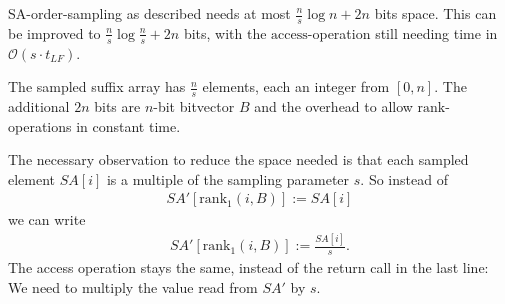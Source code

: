 \begin{Theorem}
  SA-order-sampling as described needs at most $\frac{n}{s}\log n + 2n$ bits space. This can be improved to $\frac{n}{s}\log\frac{n}{s} + 2n$ bits, with the $\mathrm{access}$-operation still needing time in $\mathcal{O}(s\cdot t_{LF})$.
\end{Theorem}

\begin{Proof}
  The sampled suffix array has $\frac{n}{s}$ elements, each an integer from $[0,n]$. The additional $2n$ bits are $n$-bit bitvector $B$ and the overhead to allow $\mathrm{rank}$-operations in constant time.

  The necessary observation to reduce the space needed is that each sampled element $SA[i]$ is a multiple of the sampling parameter $s$. So instead of \begin{align}
    SA'[\mathrm{rank}_1(i, B)] := SA[i]
  \end{align}
  we can write
  \begin{align}
    SA'[\mathrm{rank}_1(i, B)] := \frac{SA[i]}{s}
    \text{.}
  \end{align}
  The access operation stays the same, instead of the return call in the last line: We need to multiply the value read from $SA'$ by $s$.
\end{Proof}

